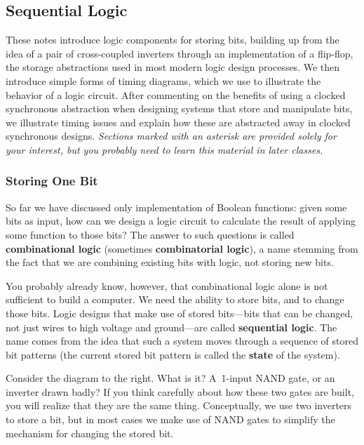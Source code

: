\classtitle

\subsection{Sequential Logic}

These notes introduce logic components for storing bits, building up
from the idea of a pair of cross-coupled inverters through an
implementation of a flip-flop, the storage abstractions used in most 
modern logic design processes.  We then introduce simple forms of
timing diagrams, which we use to illustrate the behavior of
a logic circuit.
%
After commenting on the benefits of using a clocked synchronous 
abstraction when designing systems that store and manipulate bits,
we illustrate timing issues and explain how these are abstracted
away in clocked synchronous designs.
%
{\em Sections marked with an asterisk are provided solely for your
interest, but you probably need to learn this material in later
classes.}\\ 

\vfill

\subsubsection{Storing One Bit}

So far we have discussed only implementation of Boolean functions:
given some bits as input, how can we design a logic circuit to calculate
the result of applying some function to those bits?  The answer to
such questions is called {\bf combinational logic} (sometimes 
{\bf combinatorial logic}), a name stemming from the fact that we
are combining existing bits with logic, not storing new bits.

You probably already know, however, that combinational logic alone is
not sufficient to build a computer.  We need the ability to store bits,
and to change those bits.  Logic designs that make use of stored 
bits---bits that can be changed, not just wires to high voltage and 
ground---are called {\bf sequential logic}.  The name comes from the idea 
that such a system moves through a sequence of stored bit patterns (the 
current stored bit pattern is called the {\bf state} of the system).

\begin{minipage}{4.35in}
Consider the diagram to the right.  What is it?  A~\mbox{1-input} 
NAND gate, or an inverter drawn badly?  If you think carefully about
how these two gates are built, you will realize that they are the
same thing.  Conceptually, we use two inverters to store a bit, but
in most cases we make use of NAND gates to simplify the 
mechanism for changing the stored bit.
\end{minipage}\hspace{.25in}%
\begin{minipage}{1.9in}
\end{minipage}

